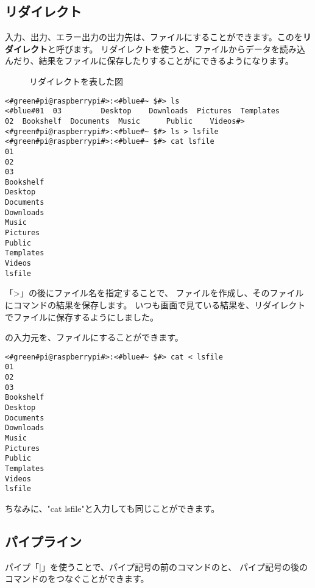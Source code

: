 \subsection{リダイレクト}
入力、出力、エラー出力の出力先は、ファイルにすることができます。このを{\bf リダイレクト}と呼びます。
リダイレクトを使うと、ファイルからデータを読み込んだり、結果をファイルに保存したりすることがにできるようになります。
\begin{figure}
    \centering
    
    \caption{リダイレクトを表した図}
    \label{ch03:redirect}
\end{figure}
\begin{lstlisting}[caption=lsの出力をリダイレクトする, label=redirectLs]
<#green#pi@raspberrypi#>:<#blue#~ $#> ls 
<#blue#01  03         Desktop    Downloads  Pictures  Templates
02  Bookshelf  Documents  Music      Public    Videos#>
<#green#pi@raspberrypi#>:<#blue#~ $#> ls > lsfile
<#green#pi@raspberrypi#>:<#blue#~ $#> cat lsfile
01
02
03
Bookshelf
Desktop
Documents
Downloads
Music
Pictures
Public
Templates
Videos
lsfile
\end{lstlisting}

「>」の後にファイル名を指定することで、
ファイルを作成し、そのファイルにコマンドの結果を保存します。
いつも画面で見ている結果を、リダイレクトでファイルに保存するようにしました。

の入力元を、ファイルにすることができます。
\begin{lstlisting}[caption=catコマンドにリダイレクトでファイルを入力する, label=redirectCat]
<#green#pi@raspberrypi#>:<#blue#~ $#> cat < lsfile
01
02
03
Bookshelf
Desktop
Documents
Downloads
Music
Pictures
Public
Templates
Videos
lsfile
\end{lstlisting}

ちなみに、"cat lsfile"と入力しても同じことができます。

\subsection{パイプライン}\label{sec:pipelne}

パイプ「|」を使うことで、パイプ記号の前のコマンドのと、
パイプ記号の後のコマンドのをつなぐことができます。


